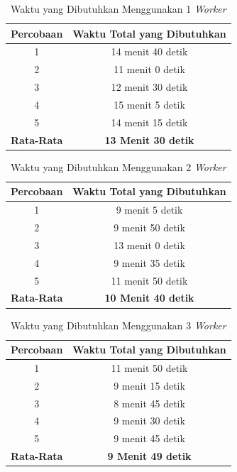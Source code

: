 \begin{longtable}{|c|c|}
  \caption{Waktu yang Dibutuhkan Menggunakan 1 \emph{Worker}}
  \label{tb:test-1-worker}                                   \\
  \hline
  \rowcolor[HTML]{C0C0C0}
  \textbf{Percobaan} & \textbf{Waktu Total yang Dibutuhkan} \\
  \hline
  1            & 14 menit 40 detik \\
  2            & 11 menit  0 detik \\
  3            & 12 menit 30 detik \\
  4            & 15 menit  5 detik \\
  5            & 14 menit 15 detik \\
  \hline
  \textbf{Rata-Rata} & \textbf{13 Menit 30 detik} \\
  \hline
\end{longtable}

\clearpage

\begin{longtable}{|c|c|}
  \caption{Waktu yang Dibutuhkan Menggunakan 2 \emph{Worker}}
  \label{tb:test-2-worker}                                   \\
  \hline
  \rowcolor[HTML]{C0C0C0}
  \textbf{Percobaan} & \textbf{Waktu Total yang Dibutuhkan} \\
  \hline
  1 &  9 menit  5 detik \\
  2 &  9 menit 50 detik \\
  3 & 13 menit  0 detik \\
  4 &  9 menit 35 detik \\
  5 & 11 menit 50 detik \\
  \hline
  \textbf{Rata-Rata} & \textbf{10 Menit 40 detik} \\
  \hline
\end{longtable}

\begin{longtable}{|c|c|}
  \caption{Waktu yang Dibutuhkan Menggunakan 3 \emph{Worker}}
  \label{tb:test-3-worker}                                   \\
  \hline
  \rowcolor[HTML]{C0C0C0}
  \textbf{Percobaan} & \textbf{Waktu Total yang Dibutuhkan} \\
  \hline
  1 & 11 menit 50 detik \\
  2 &  9 menit 15 detik \\
  3 &  8 menit 45 detik \\
  4 &  9 menit 30 detik \\
  5 &  9 menit 45 detik \\
  \hline
  \textbf{Rata-Rata} & \textbf{9 Menit 49 detik} \\
  \hline
\end{longtable}

